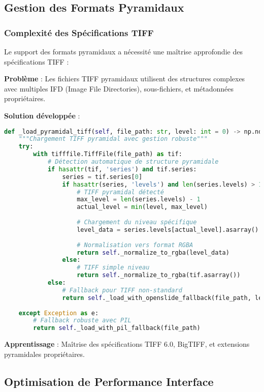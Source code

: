 \documentclass[12pt,a4paper]{report}
\begin{document}
\subsection{Gestion des Formats Pyramidaux}

\subsubsection{Complexité des Spécifications TIFF}

Le support des formats pyramidaux a nécessité une maîtrise approfondie des spécifications TIFF :

\textbf{Problème} : Les fichiers TIFF pyramidaux utilisent des structures complexes avec multiples IFD (Image File Directories), sous-fichiers, et métadonnées propriétaires.

\textbf{Solution développée} :
\begin{lstlisting}[language=Python]
def _load_pyramidal_tiff(self, file_path: str, level: int = 0) -> np.ndarray:
    """Chargement TIFF pyramidal avec gestion robuste"""
    try:
        with tifffile.TiffFile(file_path) as tif:
            # Détection automatique de structure pyramidale
            if hasattr(tif, 'series') and tif.series:
                series = tif.series[0]
                if hasattr(series, 'levels') and len(series.levels) > 1:
                    # TIFF pyramidal détecté
                    max_level = len(series.levels) - 1
                    actual_level = min(level, max_level)
                    
                    # Chargement du niveau spécifique
                    level_data = series.levels[actual_level].asarray()
                    
                    # Normalisation vers format RGBA
                    return self._normalize_to_rgba(level_data)
                else:
                    # TIFF simple niveau
                    return self._normalize_to_rgba(tif.asarray())
            else:
                # Fallback pour TIFF non-standard
                return self._load_with_openslide_fallback(file_path, level)
                
    except Exception as e:
        # Fallback robuste avec PIL
        return self._load_with_pil_fallback(file_path)
\end{lstlisting}

\textbf{Apprentissage} : Maîtrise des spécifications TIFF 6.0, BigTIFF, et extensions pyramidales propriétaires.

\subsection{Optimisation de Performance Interface}
\end{document}
